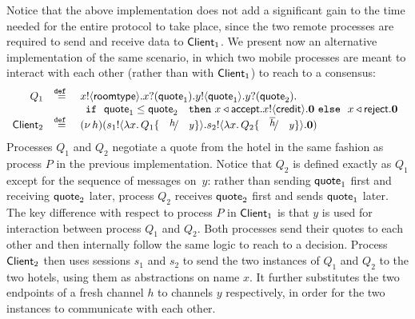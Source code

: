 \begin{example}
		Notice that the above implementation does not add a significant gain
to the time needed for the entire protocol to take
place, since the two remote processes are required
to send and receive data to $\mathsf{Client}_1$.
We present now an alternative implementation
of the same scenario, in which two mobile processes are meant 
to interact with each other (rather than with $\mathsf{Client}_1$) to reach to a consensus:
%
\[
	\begin{array}{rcl}
		Q_1 &\defeq&	\bout{x}{\rtype} \binp{x}{\Quote_1} \bout{y}{\Quote_1} \binp{y}{\Quote_2}\\
			&&
				\begin{array}{ll}
					\If\ \Quote_1 \leq \Quote_2 &\Then  \bsel{x}{\accept} \bout{x}{\creditc} \inact \  \Else \ \bsel{x}{\reject} \inact %
				\end{array}
		\\
		\Client_2 &\defeq& \newsp{h}{\bout{s_1}{\abs{x}{Q_1 \subst{h}{y}}} \bout{s_2}{\abs{x}{Q_2 \subst{\dual{h}}{y}}} \inact}
	\end{array}
\]
Processes $Q_1$ and $Q_2$  negotiate a quote from the
		hotel in the same fashion as process $P$ in the previous implementation.
		Notice that $Q_2$ is defined exactly as $Q_1$ except for the sequence of messages on~$y$:
		rather than 
		sending $\mathsf{quote}_1$ first and receiving $\mathsf{quote}_2$ later, 
		process $Q_2$ receives $\mathsf{quote}_2$ first and sends $\mathsf{quote}_1$ later.
		The key difference with respect to process $P$ in $\mathsf{Client}_1$ is that $y$ is used for
		interaction between process $Q_1$ and $Q_2$. Both processes send
		their quotes to each other and then internally follow the same
		logic to reach to a decision.
		Process  $\mathsf{Client}_2$ then uses sessions $s_1$ and $s_2$ to send the two
		instances of $Q_1$ and $Q_2$ to the two hotels, using them 
	 as abstractions
		on name $x$. It further substitutes
		the two endpoints of a fresh channel $h$ to channels $y$ respectively,
		in order for the two instances to communicate with each other.




\end{example}
